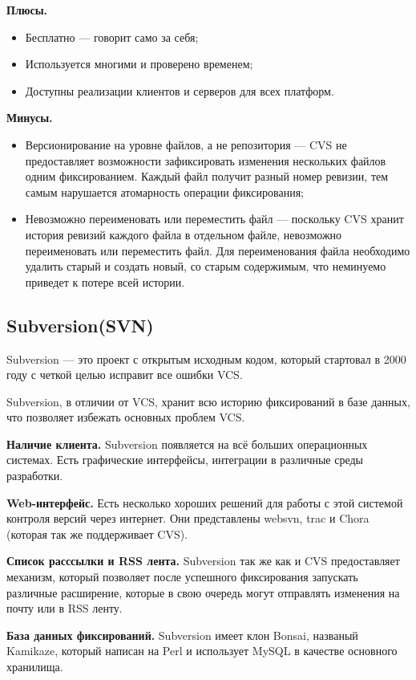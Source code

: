 \textbf{Плюсы.}
\begin{itemize}
\item Бесплатно --- говорит само за себя;
\item Используется многими и проверено временем;
\item Доступны реализации клиентов и серверов для всех платформ.
\end{itemize}

\textbf{Минусы.}
\begin{itemize}
\item Версионирование на уровне файлов, а не репозитория --- CVS не предоставляет возможности зафиксировать изменения нескольких файлов одним фиксированием. Каждый файл получит разный номер ревизии, тем самым нарушается атомарность операции фиксирования;
\item Невозможно переименовать или переместить файл --- поскольку CVS хранит история ревизий каждого файла в отдельном файле, невозможно переименовать или переместить файл. Для переименования файла необходимо удалить старый и создать новый, со старым содержимым, что неминуемо приведет к потере всей истории.
\end{itemize}


\subsection{ Subversion(SVN) } \label{sect2_4_3}

Subversion --- это проект с открытым исходным кодом, который стартовал в 2000 году с четкой целью исправит все ошибки VCS. 

Subversion, в отличии от VCS, хранит всю историю фиксирований в базе данных, что позволяет избежать основных проблем VCS.

\textbf{Наличие клиента.} Subversion появляется на всё больших операционных системах. Есть графические интерфейсы, интеграции в различные среды разработки.

\textbf{Web-интерфейс.} Есть несколько хороших решений для  работы с этой системой контроля версий через интернет. Они представлены websvn, trac и Chora (которая так же поддерживает CVS).

\textbf{Список расссылки и RSS лента.} Subversion так же как и CVS предоставляет механизм, который позволяет после успешного фиксирования запускать различные расширение, которые в свою очередь могут отправлять изменения на почту или в RSS ленту.

\textbf{База данных фиксирований.} Subversion имеет клон Bonsai, названый Kamikaze, который написан на Perl и использует MySQL в качестве основного хранилища.

